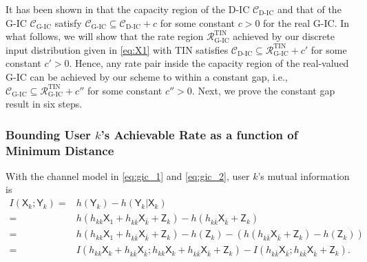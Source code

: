\documentclass[12pt, draftclsnofoot, onecolumn]{IEEEtran}
\newcommand{\msf}[1]{\mathsf{#1}}
\theoremstyle{definition}
\begin{document}
It has been shown in \cite{doi:10.1002/ett.1287} that the capacity region of the D-IC $\mathcal{C}_{\text{D-IC}}$ and that of the G-IC $\mathcal{C}_{\text{G-IC}}$ satisfy $\mathcal{C}_{\text{G-IC}} \subseteq \mathcal{C}_{\text{D-IC}} +c$ for some constant $c>0$ for the real G-IC. In what follows, we will show that the rate region $\mathcal{R}^{\text{TIN}}_{\text{G-IC}}$ achieved by our discrete input distribution given in \eqref{eq:X1} with TIN satisfies $\mathcal{C}_{\text{D-IC}} \subseteq \mathcal{R}^{\text{TIN}}_{\text{G-IC}} + c'  $ for some constant $c'>0$. Hence, any rate pair inside the capacity region of the real-valued G-IC can be achieved by our scheme to within a constant gap, i.e., $\mathcal{C}_{\text{G-IC}} \subseteq \mathcal{R}^{\text{TIN}}_{\text{G-IC}} + c''  $ for some constant $c''>0$. Next, we prove the constant gap result in six steps.


\subsubsection{Bounding User $k$'s Achievable Rate as a function of Minimum Distance}
With the channel model in \eqref{eq:gic_1} and \eqref{eq:gic_2}, user $k$'s mutual information is
\begin{align}\label{eq:user1_GC}
I(\msf{X}_k;\msf{Y}_k) =&h(\msf{Y}_k)-h(\msf{Y}_k|\msf{X}_k) \nonumber \\
=&h(h_{kk}\msf{X}_1+h_{k\bar{k}}\msf{X}_{\bar{k}}+\msf{Z}_k)-h(h_{k\bar{k}}\msf{X}_{\bar{k}}+\msf{Z}_k) \nonumber \\
=&h(h_{kk}\msf{X}_1+h_{k\bar{k}}\msf{X}_{\bar{k}}+\msf{Z}_k)-h(\msf{Z}_k)-(h(h_{k\bar{k}}\msf{X}_{\bar{k}}+\msf{Z}_k)-h(\msf{Z}_k)) \nonumber \\
=& I(h_{kk}\msf{X}_k+h_{k\bar{k}}\msf{X}_{\bar{k}};h_{kk}\msf{X}_k+h_{k\bar{k}}\msf{X}_{\bar{k}}+\msf{Z}_k)-I(h_{k\bar{k}}\msf{X}_{\bar{k}};h_{k\bar{k}}\msf{X}_{\bar{k}}+\msf{Z}_k).
\end{align}
\end{document}
